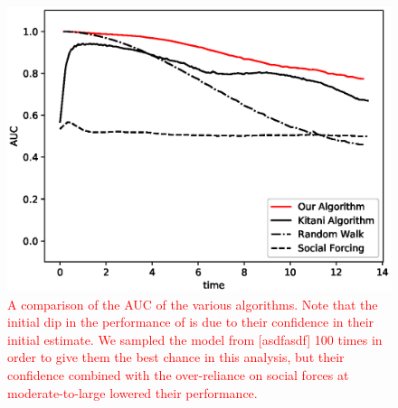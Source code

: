 \documentclass[letterpaper,10pt,conference]{ieeeconf}
\newcommand{\rtext}[1]{\textcolor{red}{#1}}
\begin{document}
\begin{figure}
	\centering
	\includegraphics[width=\linewidth]{./figures/the_results.eps}
	\caption{\rtext{A comparison of the AUC of the various algorithms. Note that the initial dip in the performance of \cite{Kitani2012} is due to their confidence in their initial estimate. We sampled the model from [asdfasdf] 100 times in order to give them the best chance in this analysis, but their confidence combined with the over-reliance on social forces at moderate-to-large lowered their performance.}}
	\label{fig:auc_vs_time}
\end{figure}
\end{document}
